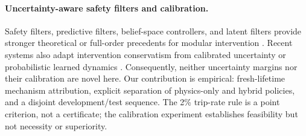 \paragraph{Uncertainty-aware safety filters and calibration.}
Safety filters, predictive filters, belief-space controllers, and latent
filters provide stronger theoretical or full-order precedents for modular
intervention \citep{hsu2024safetyfilter,wabersich2021predictive,vahs2024risk,
seo2025latent}. Recent systems also adapt intervention conservatism from
calibrated uncertainty or probabilistic learned dynamics
\citep{agrawal2026anysafe,frauenknecht2026upsi,kwon2026adaptive}. Consequently,
neither uncertainty margins nor their calibration are novel here. Our
contribution is empirical: fresh-lifetime mechanism attribution, explicit
separation of physics-only and hybrid policies, and a disjoint
development/test sequence. The 2\% trip-rate rule is a point criterion, not a
certificate; the calibration experiment establishes feasibility but not
necessity or superiority.
